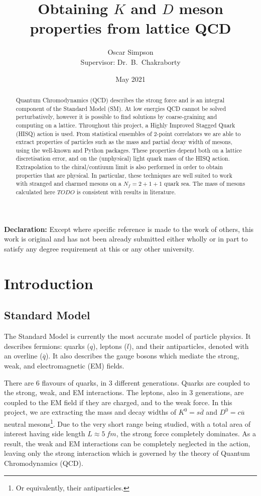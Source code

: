 \documentclass[a4paper,12pt]{article}
\title{Obtaining $K$ and $D$ meson properties from lattice QCD}
\author{Oscar Simpson \\ Supervisor: Dr.\ B.\ Chakraborty}
\date{May 2021}
\begin{document}
\maketitle
\begin{abstract}
Quantum Chromodynamics (QCD) describes the strong force and is an integral component of the Standard Model (SM). At low energies QCD cannot be solved perturbatively, however it is possible to find solutions by coarse-graining and computing on a lattice. Throughout this project, a Highly Improved Stagged Quark (HISQ) action is used. From statistical ensembles of 2-point correlators we are able to extract properties of particles such as the mass and partial decay width of mesons, using the well-known  and  Python packages. These properties depend both on a lattice discretisation error, and on the (unphysical) light quark mass of the HISQ action. Extrapolation to the chiral/contiuum limit is also performed in order to obtain properties that are physical. In particular, these techniques are well suited to work with stranged and charmed mesons on a $N_f = 2 + 1 + 1$ quark sea. The mass of mesons calculated here $TODO$ is consistent with results in literature.
\end{abstract} 

\textbf{Declaration:} Except where specific reference is made to the work of others, this work is original and has not been already submitted either wholly or in part to satisfy any degree requirement at this or any other university.

\pagebreak
\tableofcontents
\pagebreak

\section{Introduction}
\subsection{Standard Model}
The Standard Model is currently the most accurate model of particle physics. It describes fermions: quarks ($q$), leptons ($l$), and their antiparticles, denoted with an overline ($\overline{q}$). It also describes the gauge bosons which mediate the strong, weak, and electromagnetic (EM) fields. 

There are 6 flavours of quarks, in 3 different generations. Quarks are coupled to the strong, weak, and EM interactions. The leptons, also in 3 generations, are coupled to the EM field if they are charged, and to the weak force. In this project, we are extracting the mass and decay widths of $K^0=s \overline{d}$ and $D^0= c \overline{u}$ neutral mesons\footnote{Or equivalently, their antiparticles.}. Due to the very short range being studied, with a total area of interest having side length $L \approx \SI{5}{fm}$, the strong force completely dominates. As a result, the weak and EM interactions can be completely neglected in the action, leaving only the strong interaction which is governed by the theory of Quantum Chromodynamics (QCD).
\end{document}
